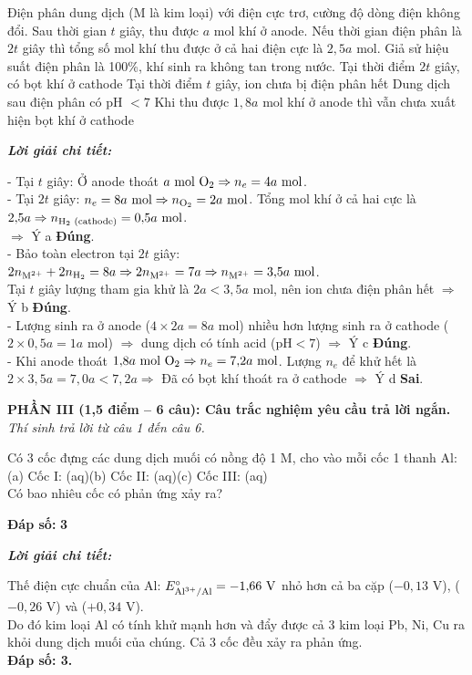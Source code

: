 \documentclass[11pt,a4paper]{article}
\def\loigiai#1{
\par\begingroup\color{blue!80!black}\small
\noindent\textbf{\textit{Lời giải chi tiết:}}\par
#1\par\endgroup}
\begin{document}
\begin{ex}
Điện phân dung dịch  (M là kim loại) với điện cực trơ, cường độ dòng điện không đổi. Sau thời gian $t$ giây, thu được $a\text{ mol}$ khí ở anode. Nếu thời gian điện phân là $2t$ giây thì tổng số mol khí thu được ở cả hai điện cực là $2{,}5a\text{ mol}$. Giả sử hiệu suất điện phân là 100\%, khí sinh ra không tan trong nước.
\choiceTF
{\True Tại thời điểm $2t$ giây, có bọt khí ở cathode}
{\True Tại thời điểm $t$ giây, ion  chưa bị điện phân hết}
{\True Dung dịch sau điện phân có pH $< 7$}
{Khi thu được $1{,}8a\text{ mol}$ khí ở anode thì vẫn chưa xuất hiện bọt khí ở cathode}
\loigiai{
- Tại $t$ giây: Ở anode thoát $a\text{ mol } \ce{O2} \Rightarrow n_e = 4a\text{ mol}$.\\
- Tại $2t$ giây: $n_e = 8a\text{ mol} \Rightarrow n_{\ce{O2}} = 2a\text{ mol}$. Tổng mol khí ở cả hai cực là $2{,}5a \Rightarrow n_{\ce{H2}\text{ (cathode)}} = 0{,}5a\text{ mol}$.\\
$\Rightarrow$ Ý a \textbf{Đúng}.\\
- Bảo toàn electron tại $2t$ giây: $2n_{\ce{M^2+}} + 2n_{\ce{H2}} = 8a \Rightarrow 2n_{\ce{M^2+}} = 7a \Rightarrow n_{\ce{M^2+}} = 3{,}5a\text{ mol}$.\\
Tại $t$ giây lượng \ce{M^2+} tham gia khử là $2a < 3{,}5a\text{ mol}$, nên ion \ce{M^2+} chưa điện phân hết $\Rightarrow$ Ý b \textbf{Đúng}.\\
- Lượng \ce{H+} sinh ra ở anode ($4 \times 2a = 8a\text{ mol}$) nhiều hơn lượng \ce{OH-} sinh ra ở cathode ($2 \times 0{,}5a = 1a\text{ mol}$) $\Rightarrow$ dung dịch có tính acid ($\text{pH} < 7$) $\Rightarrow$ Ý c \textbf{Đúng}.\\
- Khi anode thoát $1{,}8a\text{ mol } \ce{O2} \Rightarrow n_e = 7{,}2a\text{ mol}$. Lượng $n_e$ để khử hết \ce{M^2+} là $2 \times 3{,}5a = 7{,}0a < 7{,}2a \Rightarrow$ Đã có bọt khí \ce{H2} thoát ra ở cathode $\Rightarrow$ Ý d \textbf{Sai}.}
\end{ex}



\noindent
\textbf{PHẦN III (1,5 điểm -- 6 câu): Câu trắc nghiệm yêu cầu trả lời ngắn.}\\
\textit{Thí sinh trả lời từ câu 1 đến câu 6.}

\setcounter{ex}{0}

\begin{ex}
Có 3 cốc đựng các dung dịch muối có nồng độ 1 M, cho vào mỗi cốc 1 thanh Al:\\
(a) Cốc I:  (aq)\quad (b) Cốc II:  (aq)\quad (c) Cốc III:  (aq)\\
Có bao nhiêu cốc có phản ứng xảy ra?
\par\noindent\textbf{Đáp số:} \textbf{\color{red}3}
\loigiai{
Thế điện cực chuẩn của Al: $E^\circ_{\ce{Al^3+/Al}} = -1{,}66\text{ V}$ nhỏ hơn cả ba cặp \ce{Pb^2+/Pb} ($-0{,}13\text{ V}$), \ce{Ni^2+/Ni} ($-0{,}26\text{ V}$) và \ce{Cu^2+/Cu} ($+0{,}34\text{ V}$).\\
Do đó kim loại Al có tính khử mạnh hơn và đẩy được cả 3 kim loại Pb, Ni, Cu ra khỏi dung dịch muối của chúng. Cả 3 cốc đều xảy ra phản ứng.\\
\textbf{Đáp số: 3.}}
\end{ex}
\end{document}

